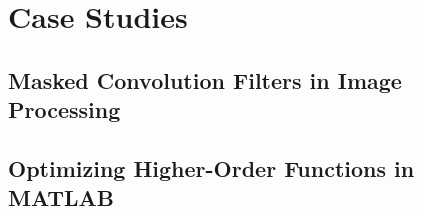 \chapter{Case Studies}

\section{Masked Convolution Filters in Image Processing}

\section{Optimizing Higher-Order Functions in MATLAB}